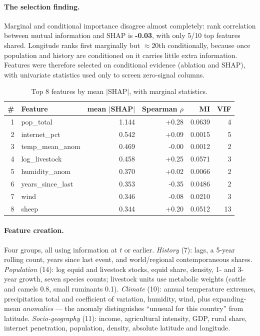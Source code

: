 \documentclass[11pt]{article}
\begin{document}
\paragraph{The selection finding.} Marginal and conditional importance disagree almost completely:
rank correlation between mutual information and SHAP is \textbf{-0.03}, with only
5/10 top features shared. Longitude ranks first marginally but $\approx$20th
conditionally, because once population and history are conditioned on it carries little extra
information. Features were therefore selected on conditional evidence (ablation and SHAP), with
univariate statistics used only to screen zero-signal columns.

\begin{table}[H]
\centering
\caption{Top 8 features by mean $|$SHAP$|$, with marginal statistics.}
\small
\begin{tabular}{@{}rlrrrr@{}}
\toprule
\textbf{\#} & \textbf{Feature} & \textbf{mean $|$SHAP$|$} & \textbf{Spearman $\rho$} &
\textbf{MI} & \textbf{VIF} \\
\midrule
1 & pop\_total & 1.144 & +0.28 & 0.0639 & 4 \\
2 & internet\_pct & 0.542 & +0.09 & 0.0015 & 5 \\
3 & temp\_mean\_anom & 0.469 & -0.00 & 0.0012 & 2 \\
4 & log\_livestock & 0.458 & +0.25 & 0.0571 & 3 \\
5 & humidity\_anom & 0.370 & +0.02 & 0.0066 & 2 \\
6 & years\_since\_last & 0.353 & -0.35 & 0.0486 & 2 \\
7 & wind & 0.346 & -0.08 & 0.0210 & 3 \\
8 & sheep & 0.344 & +0.20 & 0.0512 & 13 \\
\bottomrule
\end{tabular}
\end{table}

\paragraph{Feature creation.} Four groups, all using information at $t$ or earlier.
\emph{History} (7): lags, a 5-year rolling count, years since last event, and world/regional
contemporaneous shares. \emph{Population} (14): log equid and livestock stocks, equid share,
density, 1- and 3-year growth, seven species counts; livestock units use metabolic weights
(cattle and camels 0.8, small ruminants 0.1). \emph{Climate} (10): annual temperature extremes,
precipitation total and coefficient of variation, humidity, wind, plus expanding-mean
\emph{anomalies} --- the anomaly distinguishes ``unusual for this country'' from latitude.
\emph{Socio-geography} (11): income, agricultural intensity, GDP, rural share, internet
penetration, population, density, absolute latitude and longitude.
\end{document}
